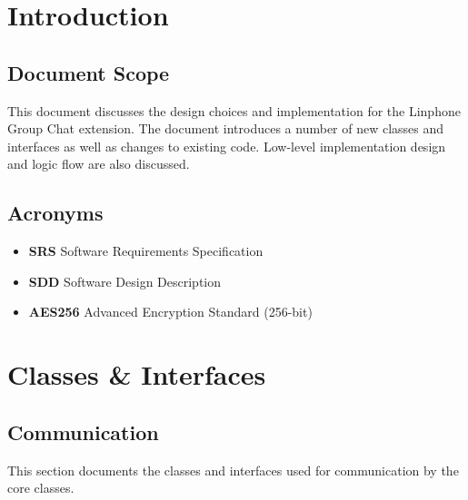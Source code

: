 \documentclass[11pt]{article}
\begin{document}
\newpage
\section{Introduction}
\subsection{Document Scope}
This document discusses the design choices and implementation for the Linphone Group Chat extension. The document introduces a number of new classes and interfaces as well as changes to existing code. Low-level implementation design and logic flow are also discussed.
\subsection{Acronyms}
\begin{itemize}
\item \textbf{SRS} Software Requirements Specification
\item \textbf{SDD} Software Design Description
\item \textbf{AES256} Advanced Encryption Standard (256-bit)
\end{itemize}

\section{Classes \& Interfaces}

\subsection{Communication}
This section documents the classes and interfaces used for communication by the core classes.
\end{document}
